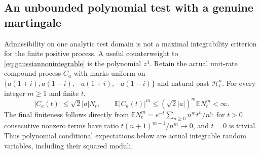 \documentclass[11pt]{article}
\newcommand{\E}{\mathbb E}\newcommand{\Pp}{\mathbb P}
\begin{document}
\subsection*{An unbounded polynomial test with a genuine martingale}
Admissibility on one analytic test domain is not a maximal
integrability criterion for the finite positive process. A useful
counterweight to \eqref{eq:gaussiannonintegrable} is the polynomial
$z^4$. Retain the actual unit-rate compound process $C_a$ with
marks uniform on $\{a(1+i),a(1-i),-a(1+i),-a(1-i)\}$ and natural
past $\mathcal H_t^a$. For every integer $m\geq1$ and finite $t$,
\[
 |C_a(t)|\leq\sqrt2|a|N_t,\qquad
 \E|C_a(t)|^m\leq(\sqrt2|a|)^m\E N_t^m<\infty.
\]
The final finiteness follows directly from
$\E N_t^m=e^{-t}\sum_{n\geq0}n^m t^n/n!$:
for $t>0$ consecutive nonzero terms have ratio
$t(n+1)^{m-1}/n^m\to0$, and $t=0$ is trivial.
Thus polynomial conditional expectations below are actual
integrable random variables, including their squared moduli.
\end{document}
